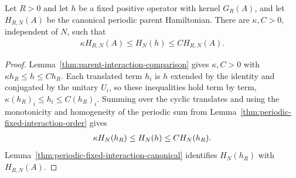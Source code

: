 \begin{lemma}
    \label{thm:positive-parent-interaction-periodic-comparison}
    \leanok
    Let $R>0$ and let $h$ be a fixed positive operator with kernel
    $G_R(A)$, and let $H_{R,N}(A)$ be the canonical periodic parent
    Hamiltonian. There are $\kappa,C>0$, independent of $N$, such that
    \begin{align}
        \kappa H_{R,N}(A)\leq H_N(h)\leq C H_{R,N}(A).
    \end{align}
\end{lemma}
\begin{proof}
    \leanok
    Lemma~\ref{thm:parent-interaction-comparison} gives $\kappa,C>0$ with
    $\kappa h_R\leq h\leq Ch_R$. Each translated term $h_i$ is $h$ extended by
    the identity and conjugated by the unitary $U_i$, so these inequalities
    hold term by term, $\kappa(h_R)_i\leq h_i\leq C(h_R)_i$. Summing over the
    cyclic translates and using the monotonicity and homogeneity of the
    periodic sum from Lemma~\ref{thm:periodic-fixed-interaction-order} gives
    \begin{align}
        \kappa H_N(h_R)\leq H_N(h)\leq CH_N(h_R).\notag
    \end{align}
    Lemma~\ref{thm:periodic-fixed-interaction-canonical} identifies
    $H_N(h_R)$ with $H_{R,N}(A)$.
\end{proof}

